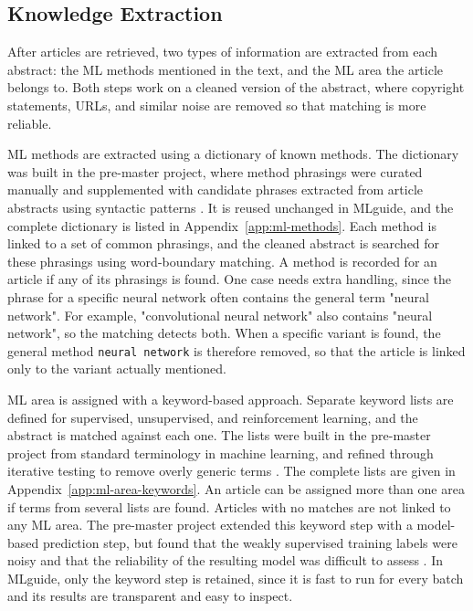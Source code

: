 \subsection{Knowledge Extraction}
\label{sec:article-retrieval-knowledge-extraction}

After articles are retrieved, two types of information are
extracted from each abstract: the ML methods mentioned in the
text, and the ML area the article belongs to. Both steps work
on a cleaned version of the abstract, where copyright statements,
URLs, and similar noise are removed so that matching is more
reliable.

ML methods are extracted using a dictionary of known methods. The
dictionary was built in the pre-master project, where method
phrasings were curated manually and supplemented with candidate
phrases extracted from article abstracts using syntactic patterns
\parencite{bergsto2026mlselection}. It is reused unchanged in
MLguide, and the complete dictionary is listed in
Appendix~\ref{app:ml-methods}. Each method is linked to a set of
common phrasings, and the cleaned abstract is searched for these
phrasings using word-boundary matching. A method is recorded for an
article if any of its phrasings is found. One case needs extra
handling, since the phrase for a specific neural network often
contains the general term "neural network". For example,
"convolutional neural network" also contains "neural network", so
the matching detects both. When a specific variant is found, the
general method \texttt{neural network} is therefore removed, so that
the article is linked only to the variant actually mentioned.

ML area is assigned with a keyword-based approach. Separate
keyword lists are defined for supervised, unsupervised, and
reinforcement learning, and the abstract is matched against each one. 
The lists were built in the pre-master project from standard
terminology in machine learning, and refined through
iterative testing to remove overly generic terms
\parencite{bergsto2026mlselection}.
The complete lists are given in
Appendix~\ref{app:ml-area-keywords}. 
An article can be assigned more than one area if terms
from several lists are found. 
Articles with no matches are not linked to any ML area. 
The pre-master project extended this keyword step with
a model-based prediction step, but found that the weakly supervised
training labels were noisy and that the reliability of the
resulting model was difficult to assess
\parencite{bergsto2026mlselection}. In MLguide, only the keyword
step is retained, since it is fast to run for every batch and its
results are transparent and easy to inspect.

